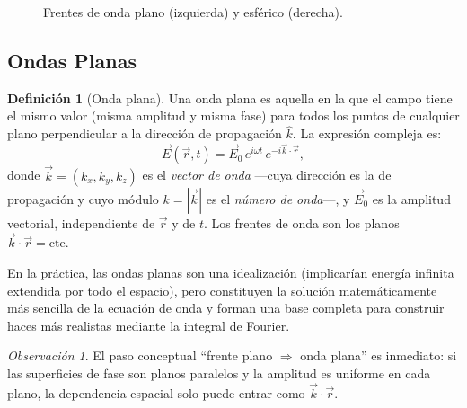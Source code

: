 \documentclass[12pt, a4paper]{article}
\theoremstyle{plain}
\theoremstyle{definition}
\newtheorem{definicion}[teorema]{Definición}
\theoremstyle{remark}
\newtheorem*{observacion}{Observación}
\newcommand{\ve}[1]{\vec{#1}}
\newcommand{\uvec}[1]{\hat{#1}}
\begin{document}
\begin{figure}[H]
  \centering
  \caption{Frentes de onda plano (izquierda) y esférico (derecha).}
  \label{fig:frentes}
\end{figure}

\subsection{Ondas Planas}

\begin{definicion}[Onda plana]
Una onda plana es aquella en la que el campo tiene el mismo valor (misma amplitud
y misma fase) para todos los puntos de cualquier plano perpendicular a la
dirección de propagación $\uvec{k}$. La expresión compleja es:
\begin{equation}
  \ve{E}(\ve{r},t) = \ve{E}_0\,e^{i\omega t}\,e^{-i\ve{k}\cdot\ve{r}},
  \label{eq:ondaplana}
\end{equation}
donde $\ve{k}=(k_x,k_y,k_z)$ es el \emph{vector de onda} —cuya dirección es
la de propagación y cuyo módulo $k = |\ve{k}|$ es el \emph{número de onda}—,
y $\ve{E}_0$ es la amplitud vectorial, independiente de $\ve{r}$ y de $t$.
Los frentes de onda son los planos $\ve{k}\cdot\ve{r} = \mathrm{cte}$.

En la práctica, las ondas planas son una idealización (implicarían energía
infinita extendida por todo el espacio), pero constituyen la solución
matemáticamente más sencilla de la ecuación de onda y forman una base completa
para construir haces más realistas mediante la integral de Fourier.
\begin{observacion}
El paso conceptual ``frente plano $\Rightarrow$ onda plana'' es inmediato:
si las superficies de fase son planos paralelos y la amplitud es uniforme en
cada plano, la dependencia espacial solo puede entrar como $\ve{k}\cdot\ve{r}$.
\end{observacion}
\end{definicion}
\end{document}

